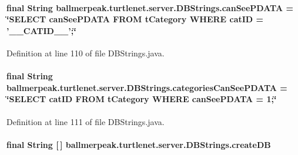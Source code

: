 \hypertarget{classballmerpeak_1_1turtlenet_1_1server_1_1DBStrings_a77d2491681df92cdf133252afe8af98d}{
\paragraph[{can\-See\-P\-D\-A\-T\-A}]{\setlength{\rightskip}{0pt plus 5cm}final String ballmerpeak.\-turtlenet.\-server.\-D\-B\-Strings.\-can\-See\-P\-D\-A\-T\-A = \char`\"{}S\-E\-L\-E\-C\-T can\-See\-P\-D\-A\-T\-A F\-R\-O\-M t\-Category W\-H\-E\-R\-E cat\-I\-D = '\-\_\-\-\_\-\-C\-A\-T\-I\-D\-\_\-\-\_\-';\char`\"{}\hspace{0.3cm}{\ttfamily [static]}}}\label{classballmerpeak_1_1turtlenet_1_1server_1_1DBStrings_a77d2491681df92cdf133252afe8af98d}


Definition at line 110 of file D\-B\-Strings.\-java.

\hypertarget{classballmerpeak_1_1turtlenet_1_1server_1_1DBStrings_af323bc7e8a4dfe7f7f321a0f868b234b}{
\paragraph[{categories\-Can\-See\-P\-D\-A\-T\-A}]{\setlength{\rightskip}{0pt plus 5cm}final String ballmerpeak.\-turtlenet.\-server.\-D\-B\-Strings.\-categories\-Can\-See\-P\-D\-A\-T\-A = \char`\"{}S\-E\-L\-E\-C\-T cat\-I\-D F\-R\-O\-M t\-Category W\-H\-E\-R\-E {\bf can\-See\-P\-D\-A\-T\-A} = 1;\char`\"{}\hspace{0.3cm}{\ttfamily [static]}}}\label{classballmerpeak_1_1turtlenet_1_1server_1_1DBStrings_af323bc7e8a4dfe7f7f321a0f868b234b}


Definition at line 111 of file D\-B\-Strings.\-java.

\hypertarget{classballmerpeak_1_1turtlenet_1_1server_1_1DBStrings_a70ba551ea4397e98cc09b96eb0d9ff43}{
\paragraph[{create\-D\-B}]{\setlength{\rightskip}{0pt plus 5cm}final String \mbox{[}$\,$\mbox{]} ballmerpeak.\-turtlenet.\-server.\-D\-B\-Strings.\-create\-D\-B\hspace{0.3cm}{\ttfamily [static]}}}\label{classballmerpeak_1_1turtlenet_1_1server_1_1DBStrings_a70ba551ea4397e98cc09b96eb0d9ff43}


